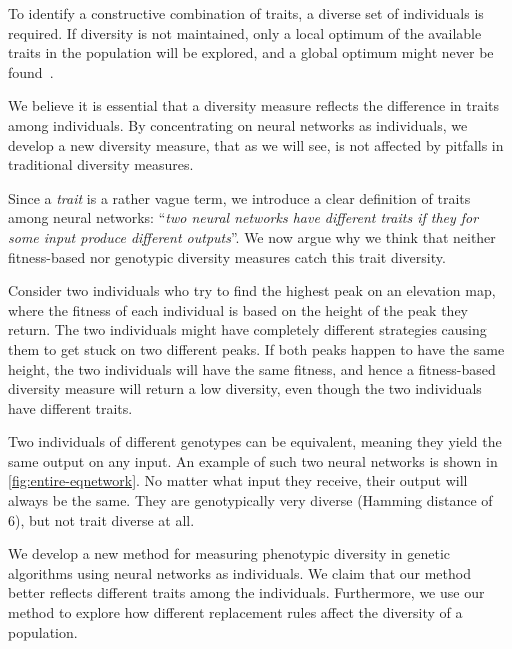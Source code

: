 To identify a constructive combination of traits, a diverse set of individuals is required. If diversity is not maintained, only a local optimum of the available traits in the population will be explored, and a global optimum might never be found~\cite{ursem2002diversity}.

We believe it is essential that a diversity measure reflects the difference in traits among individuals. By concentrating on neural networks as individuals, we develop a new diversity measure, that as we will see, is not affected by pitfalls in traditional diversity measures.

Since a \emph{trait} is a rather vague term, we introduce a clear definition of traits among neural networks: ``\emph{two neural networks have different traits if they for some input produce different outputs}''. We now argue why we think that neither fitness-based nor genotypic diversity measures catch this trait diversity. 

Consider two individuals who try to find the highest peak on an elevation map, where the fitness of each individual is based on the height of the peak they return. The two individuals might have completely different strategies causing them to get stuck on two different peaks. If both peaks happen to have the same height, the two individuals will have the same fitness, and hence a fitness-based diversity measure will return a low diversity, even though the two individuals have different traits.

Two individuals of different genotypes can be equivalent, meaning they yield the same output on any input. An example of such two neural networks is shown in \cref{fig:entire-eqnetwork}. No matter what input they receive, their output will always be the same. They are genotypically very diverse (Hamming distance of 6), but not trait diverse at all.
%

%
We develop a new method for measuring phenotypic diversity in genetic algorithms using neural networks as individuals. We claim that our method better reflects different traits among the individuals. Furthermore, we use our method to explore how different replacement rules affect the diversity of a population.

